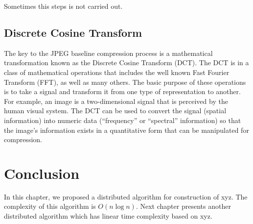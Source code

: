 Sometimes this steps is not carried out.

\subsection{Discrete Cosine Transform}

The key to the JPEG baseline compression process is a mathematical transformation known as the Discrete Cosine Transform (DCT). The DCT is in a class of mathematical operations that includes the well known Fast Fourier Transform (FFT), as well as many others. The basic purpose of these operations is to take a signal and transform it from one type of representation to another. For example, an image is a two-dimensional signal that is perceived by the human visual system. The DCT can be used to convert the signal (spatial information) into numeric data (“frequency” or “spectral” information) so that the image's information exists in a quantitative form that can be manipulated for compression.



\section{Conclusion}
In this chapter, we proposed a distributed algorithm
for construction of xyz.
The complexity of this algorithm is $O(n \log n)$.
Next chapter presents
another distributed algorithm which has linear time 
complexity based on xyz.

